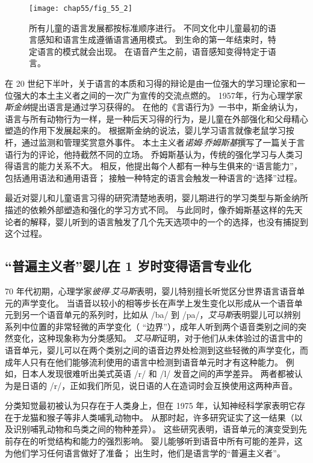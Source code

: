 \begin{figure}[htbp]
	\centering
	\texttt{[image: chap55/fig\_55\_2]}
	\caption{所有儿童的语言发展都按标准顺序进行。
		不同文化中儿童最初的语言感知和语言生成遵循语言通用模式。
		到生命的第一年结束时，特定语言的模式就会出现。
		在语音产生之前，语音感知变得特定于语言\cite{doupe1999birdsong}。
	}
	\label{fig:55_2}
\end{figure}


在 20 世纪下半叶，关于语言的本质和习得的辩论是由一位强大的学习理论家和一位强大的本土主义者之间的一次广为宣传的交流点燃的。
1957年，行为心理学家\textit{斯金纳}提出语言是通过学习获得的。
在他的《言语行为》一书中，斯金纳认为，语言与所有动物行为一样，是一种后天习得的行为，是儿童在外部强化和父母精心塑造的作用下发展起来的。
根据斯金纳的说法，婴儿学习语言就像老鼠学习按杆，通过监测和管理奖赏意外事件。
本土主义者\textit{诺姆$\cdot$乔姆斯基}撰写了一篇关于言语行为的评论，他持截然不同的立场。
乔姆斯基认为，传统的强化学习与人类习得语言的能力关系不大。
相反，他提出每个人都有一种与生俱来的“语言能力”，包括通用语法和通用语音；
接触一种特定的语言会触发一种语言的“选择”过程。


最近对婴儿和儿童语言习得的研究清楚地表明，婴儿期进行的学习类型与斯金纳所描述的依赖外部塑造和强化的学习方式不同。
与此同时，像乔姆斯基这样的先天论者的解释，婴儿听到的语言触发了几个先天选项中的一个的选择，也没有捕捉到这个过程。



\subsection{“普遍主义者”婴儿在 1 岁时变得语言专业化}

70 年代初期，心理学家\textit{彼得$\cdot$艾马斯}表明，婴儿特别擅长听觉区分世界语言语音单元的声学变化。
当语音以较小的相等步长在声学上发生变化以形成从一个语音单元到另一个语音单元的系列时，比如从 /ba/ 到 /pa/，\textit{艾马斯}表明婴儿可以辨别系列中位置的非常轻微的声学变化（ “边界”），成年人听到两个语音类别之间的突然变化，这种现象称为分类感知。
\textit{艾马斯}证明，对于他们从未体验过的语言中的语音单元，婴儿可以在两个类别之间的语音边界处检测到这些轻微的声学变化，而成年人只有在他们能够流利使用的语言中检测到语音单元时才有这种能力。
例如，日本人发现很难听出美式英语 /r/ 和 /l/ 发音之间的声学差异。
两者都被认为是日语的 /r/，正如我们所见，说日语的人在造词时会互换使用这两种声音。


分类知觉最初被认为只存在于人类身上，但在 1975 年，认知神经科学家表明它存在于龙猫和猴子等非人类哺乳动物中。
从那时起，许多研究证实了这一结果（以及识别哺乳动物和鸟类之间的物种差异）。
这些研究表明，语音单元的演变受到先前存在的听觉结构和能力的强烈影响。
婴儿能够听到语音中所有可能的差异，这为他们学习任何语言做好了准备；
出生时，他们是语言学的“普遍主义者”。


